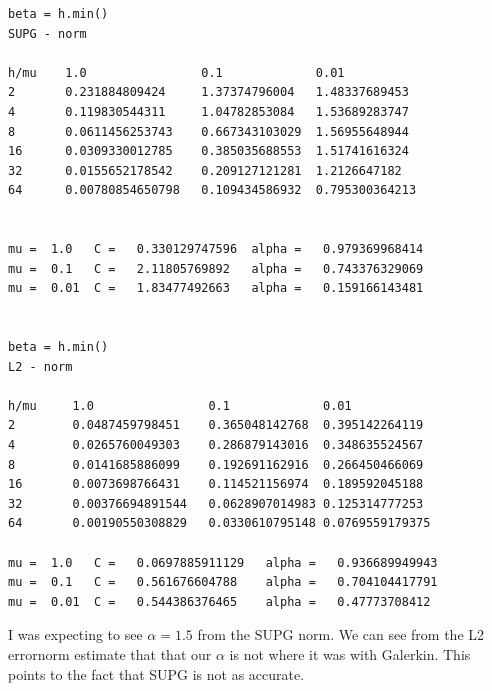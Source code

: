 \documentclass[a4paper,norsk]{article}
\begin{document}
\begin{lstlisting}
beta = h.min()
SUPG - norm

h/mu    1.0                0.1             0.01
2       0.231884809424     1.37374796004   1.48337689453
4       0.119830544311     1.04782853084   1.53689283747
8       0.0611456253743    0.667343103029  1.56955648944
16      0.0309330012785    0.385035688553  1.51741616324
32      0.0155652178542    0.209127121281  1.2126647182
64      0.00780854650798   0.109434586932  0.795300364213


mu =  1.0   C =   0.330129747596  alpha =   0.979369968414
mu =  0.1   C =   2.11805769892   alpha =   0.743376329069
mu =  0.01  C =   1.83477492663   alpha =   0.159166143481


beta = h.min()
L2 - norm

h/mu     1.0                0.1             0.01
2        0.0487459798451    0.365048142768  0.395142264119
4        0.0265760049303    0.286879143016  0.348635524567
8        0.0141685886099    0.192691162916  0.266450466069
16       0.0073698766431    0.114521156974  0.189592045188
32       0.00376694891544   0.0628907014983 0.125314777253 
64       0.00190550308829   0.0330610795148 0.0769559179375

mu =  1.0   C =   0.0697885911129   alpha =   0.936689949943
mu =  0.1   C =   0.561676604788    alpha =   0.704104417791
mu =  0.01  C =   0.544386376465    alpha =   0.47773708412

\end{lstlisting}
I was expecting to see $\alpha =1.5$ from the SUPG norm. \newline
We can see from the L2 errornorm estimate that that our $\alpha$ is not where it was with Galerkin. This points to the fact that SUPG is not as accurate.
\end{document}

